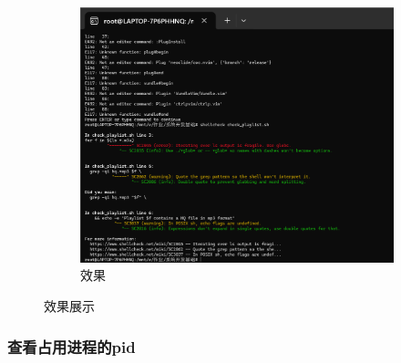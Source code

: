 \documentclass[UTF8]{ctexart}
\begin{document}
\begin{enumerate}
\begin{itemize}
\begin{figure}[H]
\begin{subfigure}[b]{0.48\textwidth}
        \includegraphics[width=\textwidth]{122} %
        \caption{效果}
        \label{fig:right}
    \end{subfigure}
    \caption{效果展示}
    \label{fig:side_by_side}
\end{figure}
  \end{itemize}
\end{enumerate}

\subsubsection{查看占用进程的pid}
\end{document}

